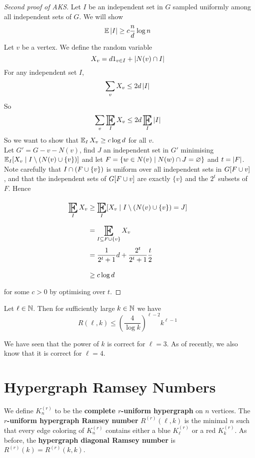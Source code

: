\documentclass{article}
\begin{document}
\newlec

\begin{proof}[Second proof of AKS]
  Let $I$ be an independent set in $G$ sampled uniformly among all independent sets of $G$. We will show
  $$\mathbb E\left\lvert I\right\rvert \ge c\frac nd\log n$$
  Let $v$ be a vertex. We define the random variable
  $$X_v = d1_{v \in I} + \left\lvert N(v) \cap I\right\rvert$$
  For any independent set $I$,
  $$\sum_v X_v \le 2d\left\lvert I\right\rvert$$
  So
  $$\sum_v \E_I X_v \le 2d \E_I \abs I$$
  So we want to show that $\E_I X_v \ge c \log d$ for all $v$. \\
  Let $G' = G - v - N(v)$, find $J$ an independent set in $G'$ minimising $\E_I[X_v \mid I \setminus (N(v) \union \{v\})]$ and let $F = \{w \in N(v) \mid N(w) \cap J = \varnothing\}$ and $t = \left\lvert F\right\rvert$. Note carefully that $I \cap (F \cup \{v\})$ is uniform over all independent sets in $G[F \cup {v}]$, and that the independent sets of $G[F \cup {v}]$ are exactly $\{v\}$ and the $2^t$ subsets of $F$. Hence
  \begin{align*}
    \E_I X_v
    & \ge \E_I[X_v \mid I \setminus (N(v) \union \{v\}) = J] \\
    & = \E_{I \subseteq F \union \{v\}} X_v \\
    & = \frac 1{2^t + 1}d + \frac{2^t}{2^t + 1}\frac t2 \\
    & \ge c \log d
  \end{align*}
  for some $c > 0$ by optimising over $t$.
\end{proof}

\begin{thm}
  Let $\ell \in \mathbb N$. Then for sufficiently large $k \in \mathbb N$ we have
  $$R(\ell, k) \le \left(\frac 4{\log k}\right)^{\ell - 2}k^{\ell - 1}$$
\end{thm}

We have seen that the power of $k$ is correct for $\ell = 3$. As of recently, we also know that it is correct for $\ell = 4$.

\clearpage

\section{Hypergraph Ramsey Numbers}

We define $K_n^{(r)}$ to be the {\bf complete $r$-uniform hypergraph} on $n$ vertices. The {\bf $r$-uniform hypergraph Ramsey number} $R^{(r)}(\ell, k)$ is the minimal $n$ such that every edge coloring of $K_n^{(r)}$ contains either a blue $K_\ell^{(r)}$ or a red $K_k^{(r)}$. As before, the {\bf hypergraph diagonal Ramsey number} is $R^{(r)}(k) = R^{(r)}(k, k)$.
\end{document}
